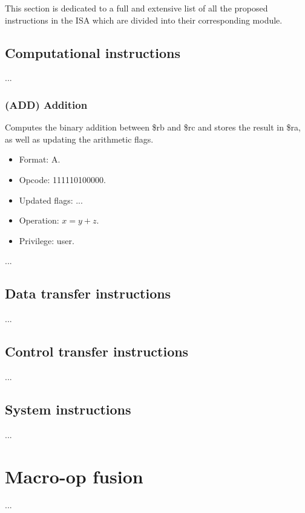 \documentclass{article}
\begin{document}
        This section is dedicated to a full and extensive list of all the proposed instructions in the ISA which are divided into their corresponding module.

        \subsection{Computational instructions}

            ...

            \subsubsection{(ADD) Addition}

            Computes the binary addition between \$rb and \$rc and stores the result in \$ra, as well as updating the arithmetic flags.

            \begin{itemize}

                \item Format: A.
                \item Opcode: 111110100000.
                \item Updated flags: ...
                \item Operation: \(x = y + z\).
                \item Privilege: user.

            \end{itemize}

            ...

        \subsection{Data transfer instructions}

            ...

        \subsection{Control transfer instructions}

            ...

        \subsection{System instructions}

            ...

    \clearpage


    \section[Macro-op fusion]{Macro-op fusion}

        ...

    \clearpage
\end{document}
